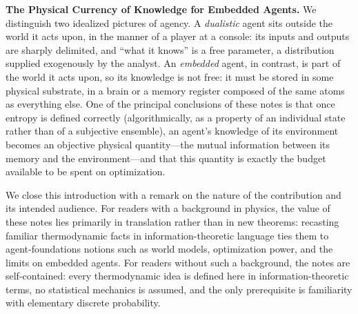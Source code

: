 \documentclass[11pt]{article}
\begin{document}
\textbf{The Physical Currency of Knowledge for Embedded Agents.} We distinguish two idealized pictures of agency. A \emph{dualistic} agent sits outside the world it acts upon, in the manner of a player at a console: its inputs and outputs are sharply delimited, and ``what it knows'' is a free parameter, a distribution supplied exogenously by the analyst. An \emph{embedded} agent, in contrast, is part of the world it acts upon, so its knowledge is not free: it must be stored in some physical substrate, in a brain or a memory register composed of the same atoms as everything else. One of the principal conclusions of these notes is that once entropy is defined correctly (algorithmically, as a property of an individual state rather than of a subjective ensemble), an agent's knowledge of its environment becomes an objective physical quantity---the mutual information between its memory and the environment---and that this quantity is exactly the budget available to be spent on optimization.

We close this introduction with a remark on the nature of the contribution and its intended audience. For readers with a background in physics, the value of these notes lies primarily in translation rather than in new theorems: recasting familiar thermodynamic facts in information-theoretic language ties them to agent-foundations notions such as world models, optimization power, and the limits on embedded agents. For readers without such a background, the notes are self-contained: every thermodynamic idea is defined here in information-theoretic terms, no statistical mechanics is assumed, and the only prerequisite is familiarity with elementary discrete probability.
\end{document}
